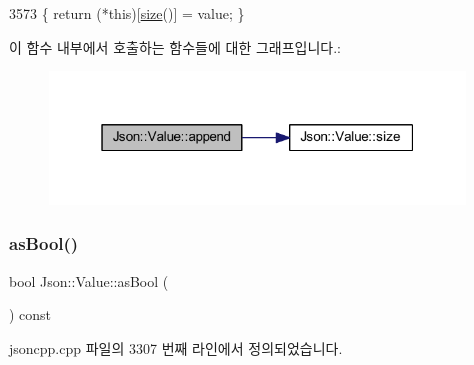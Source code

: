 \begin{DoxyCode}
3573 \{ \textcolor{keywordflow}{return} (*\textcolor{keyword}{this})[\hyperlink{class_json_1_1_value_a0ec2808e1d7efa4e9fad938d6667be44}{size}()] = value; \}
\end{DoxyCode}
이 함수 내부에서 호출하는 함수들에 대한 그래프입니다.\+:
\nopagebreak
\begin{figure}[H]
\begin{center}
\leavevmode
\includegraphics[width=313pt]{class_json_1_1_value_a7e49ac977e4bcf59745a09d426669f75_cgraph}
\end{center}
\end{figure}
\mbox{\label{class_json_1_1_value_ab693fb7b9b1595bb0adc49658bbf780d}} 
\subsubsection{\texorpdfstring{as\+Bool()}{asBool()}}
{\footnotesize\ttfamily bool Json\+::\+Value\+::as\+Bool (\begin{DoxyParamCaption}{ }\end{DoxyParamCaption}) const}



jsoncpp.\+cpp 파일의 3307 번째 라인에서 정의되었습니다.



